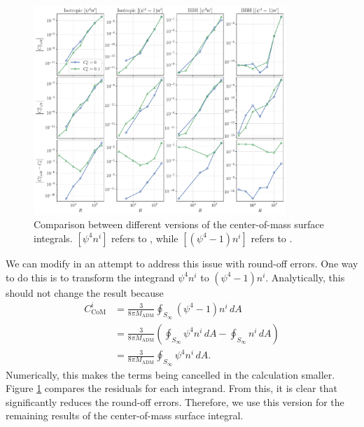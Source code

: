 \documentclass{../document}
\begin{document}
      \begin{figure}
        \centering
        \includegraphics[width=0.85\textwidth]{../../plots/final_report/distance_convergence_CoM_round_off.pdf}
        \caption{Comparison between different versions of the center-of-mass surface integrals. $[\psi^4 n^i]$ refers to \eq{\eqref{eq:CoM-surf}}, while $[(\psi^4-1) n^i]$ refers to \eq{\eqref{eq:CoM-surf-1}}.}
        \label{fig:distance_convergence_CoM_round_off}
      \end{figure}

      We can modify \eq{\eqref{eq:CoM-surf}} in an attempt to address this issue with round-off errors. One way to do this is to transform the integrand $\psi^4 n^i$ to $(\psi^4 - 1) n^i$. Analytically, this should not change the result because
      \begin{align}
        C_\text{CoM}^i
        &= \frac{3}{8 \pi M_\text{ADM}} \oint_{S_\infty} (\psi^4-1) n^i \, dA \label{eq:CoM-surf-1} \\
        &= \frac{3}{8 \pi M_\text{ADM}} \left( \oint_{S_\infty} \psi^4 n^i \, dA - \oint_{S_\infty} n^i \, dA \right) \\
        &= \frac{3}{8 \pi M_\text{ADM}} \oint_{S_\infty} \psi^4 n^i \, dA.
      \end{align}
      Numerically, this makes the terms being cancelled in the calculation smaller. Figure \ref{fig:distance_convergence_CoM_round_off} compares the residuals for each integrand. From this, it is clear that \eq{\eqref{eq:CoM-surf-1}} significantly reduces the round-off errors. Therefore, we use this version for the remaining results of the center-of-mass surface integral.
\end{document}
